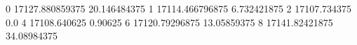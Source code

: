 0 17127.880859375 20.146484375
1 17114.466796875 6.732421875
2 17107.734375 0.0
4 17108.640625 0.90625
6 17120.79296875 13.05859375
8 17141.82421875 34.08984375
